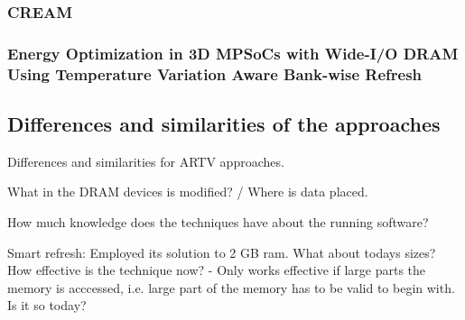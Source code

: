\subsubsection*{\textbf{CREAM}}
\label{par:cream}



\subsubsection*{\textbf{Energy Optimization in 3D MPSoCs with Wide-I/O DRAM
Using Temperature Variation Aware Bank-wise Refresh}}
\label{par:tempaware}



\subsection{Differences and similarities of the approaches}

Differences and similarities for ARTV approaches.

What in the DRAM devices is modified? / Where is data placed.

How much knowledge does the techniques have about the running software?

Smart refresh:
Employed its solution to 2 GB ram. What about todays sizes? How effective is the technique now? - Only works effective if large parts the memory is acccessed, i.e. large part of the memory has to be valid to begin with. Is it so today?
